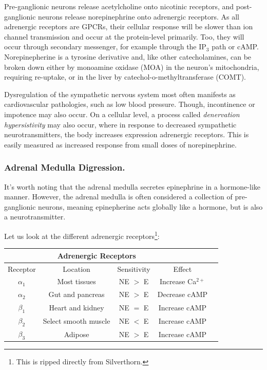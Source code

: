 \documentclass[12pt]{report}
\begin{document}
Pre-ganglionic neurons release acetylcholine onto nicotinic receptors,  and post-ganglionic neurons release norepinephrine onto adrenergic receptors. As all adrenergic receptors are GPCRs, their cellular response will be slower than ion channel transmission and occur at the protein-level primarily. Too, they will occur through secondary messenger, for example through the IP$_3$ path or cAMP. Norepinepherine is a tyrosine derivative and, like other catecholamines, can be broken down either by monoamine oxidase (MOA) in the neuron's mitochondria, requiring re-uptake, or in the liver by catechol-o-methyltransferase (COMT).\newline

Dysregulation of the sympathetic nervous system most often manifests as cardiovascular pathologies, such as low blood pressure. Though, incontinence or impotence may also occur. On a cellular level, a process called \textit{denervation hypersistivity} may also occur, where in response to decreased sympathetic neurotransmitters, the body increases expression adrenergic receptors. This is easily measured as increased response from small doses of norepinephrine. 

\subsubsection{Adrenal Medulla Digression.} 
It's worth noting that the adrenal medulla secretes epinephrine in a hormone-like manner. However, the adrenal medulla is often considered a collection of pre-ganglionic neurons, meaning epinepherine acts globally like a hormone, but is also a neurotransmitter.\newline

Let us look at the different adrenergic receptors\footnote{This is ripped directly from Silverthorn.}: 

\begin{table}[!htbp]
\centering
\begin{tabular}{*5c}
\toprule
{} &  \multicolumn{2}{c}{Adrenergic Receptors} & \\
\midrule
{Receptor}   & Location & Sensitivity & Effect \\
\midrule
$\alpha_1$  &  Most tissues & NE $>$ E & Increase Ca$^{2+}$   \\
$\alpha_2$  &  Gut and pancreas & NE $>$ E & Decrease cAMP  \\
$\beta_1$   &  Heart and kidney  &  NE $=$ E & Increase cAMP   \\
$\beta_2$   &  Select smooth muscle  &  NE $<$ E & Increase cAMP   \\
$\beta_3$  &  Adipose  & NE $>$ E & Increase cAMP   \\
\bottomrule
\end{tabular}
\end{table}
\end{document}
